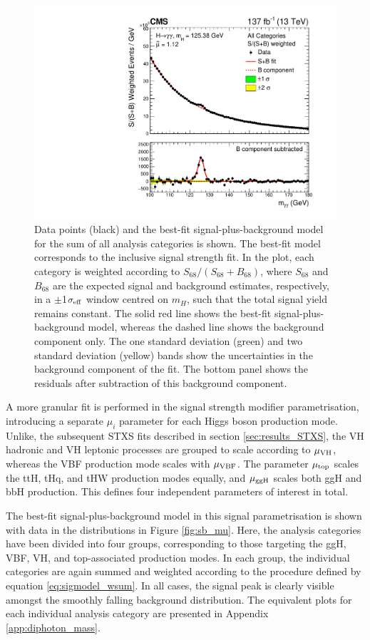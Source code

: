 \begin{figure}[htb]
  \centering
  \includegraphics[width=.6\textwidth]{Figures/hgg_results/sPlusBweighted.pdf}
  \caption[Observed diphoton mass distribution for the sum of all analysis categories]
  {
    Data points (black) and the best-fit signal-plus-background model for the sum of all analysis categories is shown. The best-fit model corresponds to the inclusive signal strength fit. In the plot, each category is weighted according to $S_{68}/(S_{68}+B_{68})$, where $S_{68}$ and $B_{68}$ are the expected signal and background estimates, respectively, in a $\pm$1$\sigma_{\rm{eff}}$ window centred on $m_H$, such that the total signal yield remains constant. The solid red line shows the best-fit signal-plus-background model, whereas the dashed line shows the background component only. The one standard deviation (green) and two standard deviation (yellow) bands show the uncertainties in the background component of the fit. The bottom panel shows the residuals after subtraction of this background component.
  }
  \label{fig:sb_inclusive}
\end{figure}

A more granular fit is performed in the signal strength modifier parametrisation, introducing a separate $\mu_i$ parameter for each Higgs boson production mode. Unlike, the subsequent STXS fits described in section \ref{sec:results_STXS}, the VH hadronic and VH leptonic processes are grouped to scale according to $\mu_{\rm{VH}}$, whereas the VBF production mode scales with $\mu_{\rm{VBF}}$. The parameter $\mu_{\rm{top}}$ scales the ttH, tHq, and tHW production modes equally, and $\mu_{\rm{ggH}}$ scales both ggH and bbH production. This defines four independent parameters of interest in total.

The best-fit signal-plus-background model in this signal parametrisation is shown with data in the \mgg distributions in Figure \ref{fig:sb_mu}. Here, the analysis categories have been divided into four groups, corresponding to those targeting the ggH, VBF, VH, and top-associated production modes. In each group, the individual categories are again summed and weighted according to the procedure defined by equation \ref{eq:sigmodel_wsum}. In all cases, the signal peak is clearly visible amongst the smoothly falling background distribution. The equivalent plots for each individual analysis category are presented in Appendix \ref{app:diphoton_mass}.

